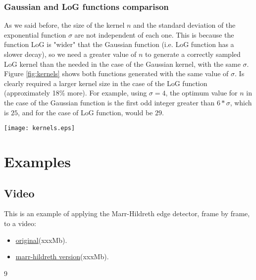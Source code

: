 \documentclass{ipol}
\numberwithin{equation}{section}
\numberwithin{table}{section}
\numberwithin{figure}{section}
\begin{document}
\subsubsection{Gaussian and LoG functions comparison}

As we said before, the size of the kernel $n$ and the standard deviation of the exponential function 
$\sigma$ are not independent of each one. This is because the function LoG is "wider" that the 
Gaussian function (i.e. LoG function has a slower decay), so we need a greater value of $n$ to 
generate a correctly sampled LoG kernel than the needed in the case of the Gaussian kernel, with the same $\sigma$.\\

Figure \ref{fig:kernels} shows both functions generated with the same value of $\sigma$. Is clearly 
required a larger kernel size in the case of the LoG function (approximately 18\% more). For 
example, using $\sigma=4$, the optimum value for $n$ in the case of the Gaussian function is the 
first odd integer greater than $6*\sigma$, which is $25$, and for the case of LoG function, would 
be $29$.\\

\begin{SCfigure}[][!b]
	\centering
	\texttt{[image: kernels.eps]}
	\caption{Comparison of the Gaussian and LoG functions.}
	\label{fig:kernels}
\end{SCfigure}

\section{Examples}
\label{sec:examples}

\subsection{Video}

This is an example of applying the Marr-Hildreth edge detector, frame by frame, to a video:
\begin{itemize}
	\item \href{http://iie.fing.edu.uy/~haldos/ipol/video.mov}{original}(xxxMb).
	\item \href{http://iie.fing.edu.uy/~haldos/ipol/video-marr-hildreth.mov}{marr-hildreth version}(xxxMb).
\end{itemize}

\begin{thebibliography}{9}

\end{thebibliography}
\end{document}
